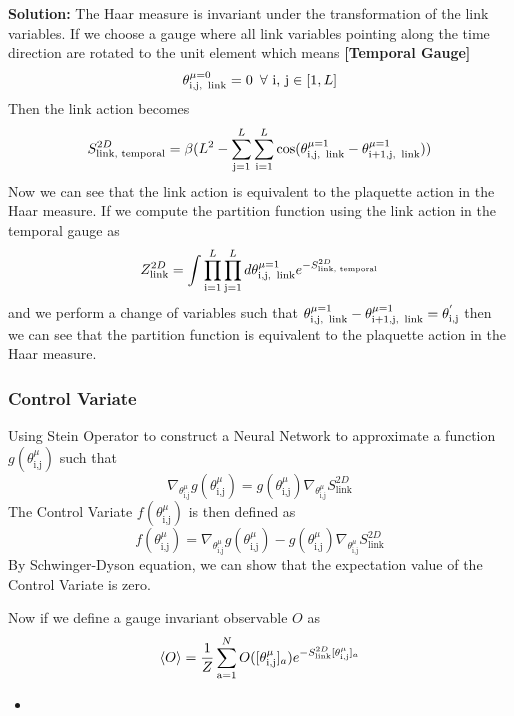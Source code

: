 \textbf{Solution:}
The Haar measure is invariant under the transformation of the link variables. If we choose a gauge where all link variables pointing along the time direction are rotated to the unit element which means \textbf{[Temporal Gauge]} $$\theta^{\mu=0}_{\text{i,j,\, link}} = 0 \,\,\,\forall\,\,\text{i, j}\in[1, L]$$
Then the link action becomes
\begin{equation}
    S_{\text{link, temporal}}^{2D} = \beta(L^2- \sum_{\text{j}=1}^{L}\sum_{\text{i}=1}^{L}\cos(\theta_{\text{i,j, \,link}}^{\mu=1}-\theta_{\text{i+1,j, \,link}}^{\mu=1}))
\end{equation}
Now we can see that the link action is equivalent to the plaquette action in the Haar measure. If we compute the partition function using the link action in the temporal gauge as
\begin{equation}
    Z^{2D}_{\text{link}} = \int \prod_{\text{i}=1}^{L}\prod_{\text{j}=1}^{L}d\theta_{\text{i,j, \,link}}^{\mu=1}e^{-S_{\text{link, temporal}}^{2D}}
\end{equation}
and we perform a change of variables such that $\theta_{\text{i,j, \,link}}^{\mu=1}  - \theta_{\text{i+1,j, \,link}}^{\mu=1}= \theta^{'}_{\text{i,j}}$ then we can see that the partition function is equivalent to the plaquette action in the Haar measure.

\subsubsection*{Control Variate}
Using Stein Operator to construct a Neural Network to approximate a function $g(\theta^{\mu}_{\text{i,j}})$ such that
\begin{equation}
    \nabla_{\theta^{\mu}_{\text{i,j}}}g(\theta^{\mu}_{\text{i,j}}) = g(\theta^{\mu}_{\text{i,j}})\nabla_{\theta^{\mu}_{\text{i,j}}}S_{\text{link}}^{2D}
\end{equation}
The Control Variate $f(\theta^{\mu}_{\text{i,j}})$ is then defined as
\begin{equation}
    f(\theta^{\mu}_{\text{i,j}}) =
    \nabla_{\theta^{\mu}_{\text{i,j}}}g(\theta^{\mu}_{\text{i,j}}) - g(\theta^{\mu}_{\text{i,j}})\nabla_{\theta^{\mu}_{\text{i,j}}}S_{\text{link}}^{2D}
\end{equation}
By Schwinger-Dyson equation, we can show that the expectation value of the Control Variate is zero.

Now if we define a gauge invariant observable $O$ as
    \begin{equation}
        \braket{O} = \frac{1}{Z}\sum_{\text{a}=1}^{N}O([\theta^{\mu}_{\text{i,j}}]_a)e^{-S_{\text{link}}^{2D}[{\theta^{\mu}_{\text{i,j}}}]_a}
    \end{equation}
\begin{itemize}
    \item 
\end{itemize}